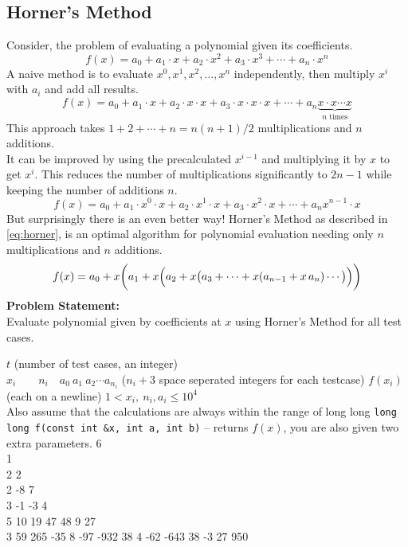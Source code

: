 \documentclass[../../Problems]{subfiles}
\begin{document}
\subsection{Horner's Method}
{\small Consider, the problem of evaluating a polynomial given its coefficients.
\begin{equation*}
	f(x)=a_{0}+a_{1}\cdot x+a_{2}\cdot x^{2}+a_{3}\cdot x^{3}+\cdots +a_{n}\cdot x^{n}
\end{equation*}
A naive method is to evaluate $x^0, x^1, x^2, \ldots, x^n$ independently, then multiply $x^i$ with $a_i$ and add all results.
\begin{equation*}
	f(x)=a_{0}+a_{1}\cdot x+a_{2}\cdot x\cdot x+a_{3}\cdot x\cdot x\cdot x+\cdots +a_{n}\underbrace{x\cdot x\cdots x}_{n\text{ times}}
\end{equation*}
This approach takes $1+2+\cdots+n=n(n+1)/2$ multiplications and $n$ additions.\\
It can be improved by using the precalculated $x^{i-1}$ and multiplying it by $x$ to get $x^{i}$. This reduces the number of multiplications significantly to $2n-1$ while keeping the number of additions $n$.
\begin{equation*}
	f(x)=a_{0}+a_{1}\cdot x^0\cdot x+a_{2}\cdot x^1\cdot x+a_{3}\cdot x^2\cdot x+\cdots +a_{n}x^{n-1}\cdot x
\end{equation*}
But surprisingly there is an even better way! Horner's Method as described in \ref{eq:horner}, is an optimal algorithm for polynomial evaluation needing only $n$ multiplications and $n$ additions.
\begin{equation}{\label{eq:horner}}
	f(x)=a_{0}+x\bigg(a_{1}+x\Big(a_{2}+x\big(a_{3}+\cdots +x(a_{n-1}+x\,a_{n})\cdots \big)\Big)\bigg)
\end{equation}
\textbf{Problem Statement:}\\
Evaluate polynomial given by coefficients at $x$ using Horner's Method for all test cases.
\begin{testcasesFunction}
	{$t$ \hfill(number of test cases, an integer)\\
	$x_i\qquad n_i \quad a_0\ a_1\ a_2 \cdots a_{n_i}$ \hfill($n_i+3$ space seperated integers for each testcase)}
	{$f(x_i)$\hfill(each on a newline)}
	{$1 < x_i,\ n_i, a_i \leq 10^{4}$\\
	Also assume that the calculations are always within the range of long long}
	{\texttt{long long f(const int \&x, int a, int b)} -- returns $f(x)$, you are also given two extra parameters.}
	{6\\1\\2 2\\2 -8 7\\3 -1 -3 4\\5 10 19 47 48 9 27\\3 59 265 -35 8 -97 -932 38 4 -62 -643 38 -3 27 950}

\end{testcasesFunction}}
\end{document}
